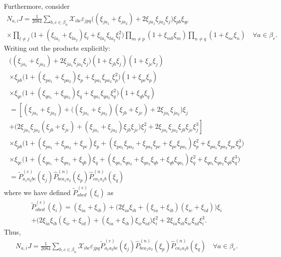\documentclass[11pt]{article} %
\begin{document}
Furthermore, consider
\begin{eqnarray}
	N_{a,i} J = \frac{1}{2084} \sum_{b, c \in \beta_n} \mathcal{X}_{ibc} \varepsilon_{jpq} \bigg((\xi_{ja_1} + \xi_{ja_2}) + 2 \xi_{ja_1} \xi_{ja_2} \xi_{j} \bigg) \xi_{pb} \xi_{qc} \nonumber \\ \times \prod_{l \neq j} \bigg( 1 + (\xi_{la_1} + \xi_{la_2}) \xi_l + \xi_{la_1} \xi_{la_2} \xi_l^2 \bigg) \prod_{m \neq p} (1 + \xi_{mb} \xi_m) \prod_{n \neq q} (1 + \xi_{nc} \xi_n) \quad \forall a \in \beta_e.
\end{eqnarray}
Writing out the products explicitly:
\begin{eqnarray}
	\bigg((\xi_{ja_1} + \xi_{ja_2}) + 2 \xi_{ja_1} \xi_{ja_2} \xi_{j} \bigg) (1 + \xi_{jb} \xi_j) (1 + \xi_{jc} \xi_j) \nonumber \\
	\times \xi_{pb} \bigg( 1 + (\xi_{pa_1} + \xi_{pa_2}) \xi_p + \xi_{pa_1} \xi_{pa_2} \xi_p^2 \bigg) (1 + \xi_{pc} \xi_p) \nonumber \\
	\times \xi_{qc} \bigg( 1 + (\xi_{qa_1} + \xi_{qa_2}) \xi_q + \xi_{qa_1} \xi_{qa_2} \xi_q^2 \bigg) (1 + \xi_{qb} \xi_q) \nonumber \\
	= \left[(\xi_{ja_1} + \xi_{ja_2}) + \bigg( (\xi_{ja_1} + \xi_{ja_2}) (\xi_{jb} + \xi_{jc}) + 2 \xi_{ja_1} \xi_{ja_2} \bigg) \xi_j \right. \nonumber \\ \left. + \bigg( 2 \xi_{ja_1} \xi_{ja_2} (\xi_{jb} + \xi_{jc}) + (\xi_{ja_1} + \xi_{ja_2}) \xi_{jb} \xi_{jc} \bigg) \xi_j^2 + 2 \xi_{ja_1} \xi_{ja_2} \xi_{jb} \xi_{jc} \xi_j^3 \right] \nonumber \\
	\times \xi_{pb} \bigg( 1 + (\xi_{pa_1} + \xi_{pa_2} + \xi_{pc}) \xi_p + ( \xi_{pa_1} \xi_{pa_2} + \xi_{pa_2} \xi_{pc} + \xi_{pc} \xi_{pa_1} ) \xi_p^2 + \xi_{pa_1} \xi_{pa_2} \xi_{pc} \xi_p^3 \bigg) \nonumber \\
	\times \xi_{qc} \bigg( 1 + (\xi_{qa_1} + \xi_{qa_2} + \xi_{qb}) \xi_q + ( \xi_{qa_1} \xi_{qa_2} + \xi_{qa_2} \xi_{qb} + \xi_{qb} \xi_{qa_1} ) \xi_q^2 + \xi_{qa_1} \xi_{qa_2} \xi_{qb} \xi_q^3 \bigg) \nonumber \\
	= \tilde{P}^{(e)}_{a_1a_2bc} (\xi_j) \hat{P}^{(n)}_{bca_1a_2} (\xi_p) \hat{P}^{(n)}_{ca_1a_2b} (\xi_q)
\end{eqnarray}
where we have defined $\tilde{P}^{(e)}_{abcd} (\xi_i)$ as
\begin{eqnarray}
	\tilde{P}^{(e)}_{abcd} (\xi_i) = (\xi_{ia} + \xi_{ib}) + \bigg( 2 \xi_{ia} \xi_{ib} + (\xi_{ia} + \xi_{ib}) (\xi_{ic} + \xi_{id}) \bigg) \xi_i \nonumber \\ + \bigg( 2 \xi_{ia} \xi_{ib} (\xi_{ic} + \xi_{id}) + (\xi_{ia} + \xi_{ib}) \xi_{ic} \xi_{id} \bigg) \xi_i^2 + 2 \xi_{ia} \xi_{ib} \xi_{ic} \xi_{id} \xi_i^3.
\end{eqnarray}
Thus,
\begin{eqnarray}
	N_{a,i} J = \frac{1}{2084} \sum_{b, c \in \beta_n} \mathcal{X}_{ibc} \varepsilon_{jpq} \tilde{P}^{(e)}_{a_1a_2bc} (\xi_j) \hat{P}^{(n)}_{bca_1a_2} (\xi_p) \hat{P}^{(n)}_{ca_1a_2b} (\xi_q) \quad \forall a \in \beta_e.
\end{eqnarray}
\end{document}
